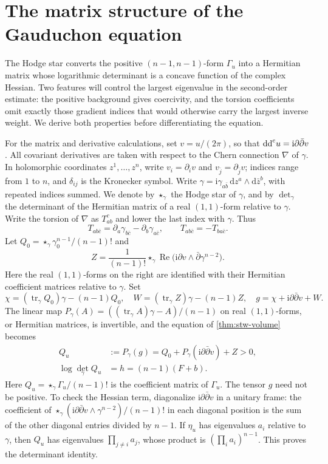 \section{The matrix structure of the Gauduchon equation}
\label{sec:stw-matrix-structure}

The Hodge star converts the positive $(n-1,n-1)$-form $\Gamma_u$ into a Hermitian matrix whose logarithmic determinant is a concave function of the complex Hessian. Two features will control the largest eigenvalue in the second-order estimate: the positive background gives coercivity, and the torsion coefficients omit exactly those gradient indices that would otherwise carry the largest inverse weight. We derive both properties before differentiating the equation.

For the matrix and derivative calculations, set $v=u/(2\pi)$, so that $\mathrm{dd}^{\mathrm{c}} u=\mathrm i\partial\bar\partial v$. All covariant derivatives are taken with respect to the Chern connection $\nabla$ of $\gamma$. In holomorphic coordinates $z^1,\ldots,z^n$, write $v_i=\partial_i v$ and $v_{\bar j}=\partial_{\bar j}v$; indices range from $1$ to $n$, and $\delta_{ij}$ is the Kronecker symbol. Write $\gamma=\mathrm i\gamma_{a\bar b}\,\mathrm{d}z^a\wedge\mathrm{d}\bar z^b$, with repeated indices summed. We denote by $\star_\gamma$ the Hodge star of $\gamma$, and by $\det_\gamma$ the determinant of the Hermitian matrix of a real $(1,1)$-form relative to $\gamma$. Write the torsion of $\nabla$ as $T_{ab}^{c}$ and lower the last index with $\gamma$. Thus
\[
 T_{ab\bar c}=\partial_a\gamma_{b\bar c}-\partial_b\gamma_{a\bar c},
 \qquad T_{ab\bar c}=-T_{ba\bar c}.
\]
Let $Q_0=\star_\gamma\gamma_0^{n-1}/(n-1)!$ and
\[
 Z=\frac1{(n-1)!}\star_\gamma
       \operatorname{Re}\bigl(\mathrm i\partial v\wedge
                    \bar\partial\gamma^{n-2}\bigr).
\]
Here the real $(1,1)$-forms on the right are identified with their Hermitian coefficient matrices relative to $\gamma$. Set
\[
 \chi=(\operatorname{tr}_\gamma Q_0)\gamma-(n-1)Q_0,
 \quad W=(\operatorname{tr}_\gamma Z)\gamma-(n-1)Z,
 \quad g=\chi+\mathrm i\partial\bar\partial v+W.
\]
The linear map $P_\gamma(A)=((\operatorname{tr}_\gamma A)\gamma-A)/(n-1)$ on real $(1,1)$-forms, or Hermitian matrices, is invertible, and the equation of \cref{thm:stw-volume} becomes
\begin{equation}\label{eq:stw-cofactor-matrix-scaling}
 \begin{aligned}
 Q_u&:=P_\gamma(g)=Q_0+P_\gamma(\mathrm i\partial\bar\partial v)+Z>0,\\
 \log\det_\gamma Q_u&=h=(n-1)(F+b).
 \end{aligned}
\end{equation}
Here $Q_u=\star_\gamma\Gamma_u/(n-1)!$ is the coefficient matrix of $\Gamma_u$. The tensor $g$ need not be positive. To check the Hessian term, diagonalize $\mathrm i\partial\bar\partial v$ in a unitary frame: the coefficient of $\star_\gamma(\mathrm i\partial\bar\partial v\wedge\gamma^{n-2})/(n-1)!$ in each diagonal position is the sum of the other diagonal entries divided by $n-1$. If $\eta_u$ has eigenvalues $a_i$ relative to $\gamma$, then $Q_u$ has eigenvalues $\prod_{j\ne i}a_j$, whose product is $(\prod_i a_i)^{n-1}$. This proves the determinant identity.

